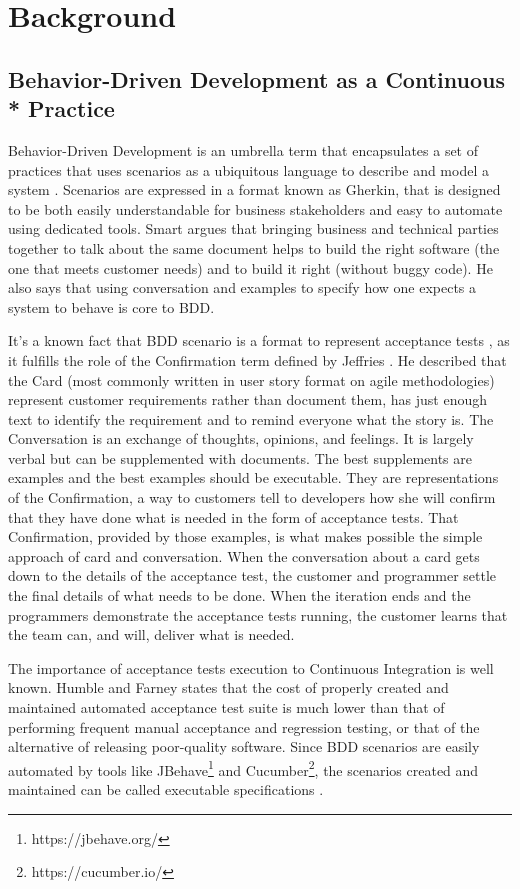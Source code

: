 \section{Background}

\subsection{Behavior-Driven Development as a Continuous * Practice}
Behavior-Driven Development is an umbrella term that encapsulates a set of practices that uses scenarios as a ubiquitous language to describe and model a system \cite{Smart_2014}. Scenarios are expressed in a format known as Gherkin, that is designed to be both easily understandable for business stakeholders and easy to automate using dedicated tools. Smart \cite{Smart_2014} argues that bringing business and technical parties together to talk about the same document helps to build the right software (the one that meets customer needs) and to build it right (without buggy code). He also says that using conversation and examples to specify how one expects a system to behave is core to BDD. 

It's a known fact that BDD scenario is a format to represent acceptance tests \cite{Gartner_2012}, as it fulfills the role of the Confirmation term defined by Jeffries \cite{Jeffries_2001}. He described that the Card (most commonly written in user story format on agile methodologies) represent customer requirements rather than document them, has just enough text to identify the requirement and to remind everyone what the story is. The Conversation is an exchange of thoughts, opinions, and feelings. It is largely verbal but can be supplemented with documents. The best supplements are examples and the best examples should be executable. They are representations of the Confirmation, a way to customers tell to developers how she will confirm that they have done what is needed in the form of acceptance tests. That Confirmation, provided by those examples, is what makes possible the simple approach of card and conversation. When the conversation about a card gets down to the details of the acceptance test, the customer and programmer settle the final details of what needs to be done. When the iteration ends and the programmers demonstrate the acceptance tests running, the customer learns that the team can, and will, deliver what is needed.

The importance of acceptance tests execution to Continuous Integration is well known. Humble and Farney \cite{Humble_Farley_2010} states that the cost of properly created and maintained automated acceptance test suite is much lower than that of performing frequent manual acceptance and regression testing, or that of the alternative of releasing poor-quality software. Since BDD scenarios are easily automated by tools like JBehave\footnote{https://jbehave.org/} and Cucumber\footnote{https://cucumber.io/}, the scenarios created and maintained can be called executable specifications \cite{Smart_2014} \cite{Humble_Farley_2010}. 

